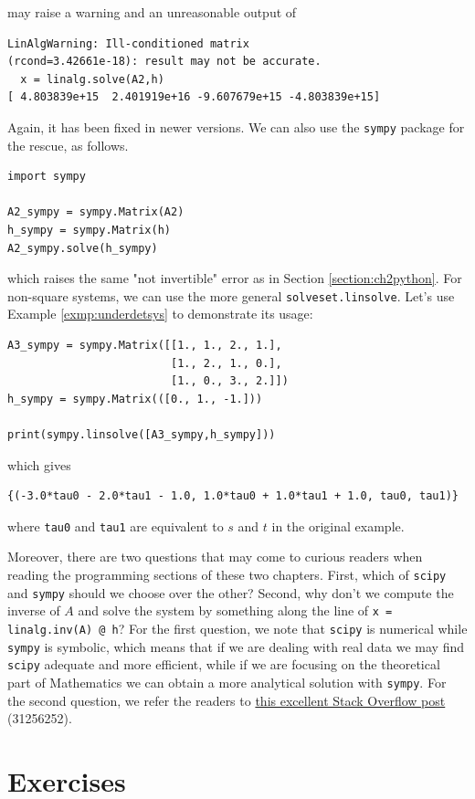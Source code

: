 may raise a warning and an unreasonable output of
\begin{lstlisting}
LinAlgWarning: Ill-conditioned matrix 
(rcond=3.42661e-18): result may not be accurate.
  x = linalg.solve(A2,h)
[ 4.803839e+15  2.401919e+16 -9.607679e+15 -4.803839e+15]   
\end{lstlisting}
Again, it has been fixed in newer versions. We can also use the \verb|sympy| package for the rescue, as follows.
\begin{lstlisting}
import sympy

A2_sympy = sympy.Matrix(A2)
h_sympy = sympy.Matrix(h)
A2_sympy.solve(h_sympy)
\end{lstlisting}
which raises the same "not invertible" error as in Section \ref{section:ch2python}. For non-square systems, we can use the more general \verb|solveset.linsolve|. Let's use Example \ref{exmp:underdetsys} to demonstrate its usage:
\begin{lstlisting}
A3_sympy = sympy.Matrix([[1., 1., 2., 1.],
                         [1., 2., 1., 0.],
                         [1., 0., 3., 2.]])
h_sympy = sympy.Matrix(([0., 1., -1.]))

print(sympy.linsolve([A3_sympy,h_sympy]))    
\end{lstlisting}
which gives
\begin{lstlisting}
{(-3.0*tau0 - 2.0*tau1 - 1.0, 1.0*tau0 + 1.0*tau1 + 1.0, tau0, tau1)}    
\end{lstlisting}
where \verb|tau0| and \verb|tau1| are equivalent to $s$ and $t$ in the original example.\par
Moreover, there are two questions that may come to curious readers when reading the programming sections of these two chapters. First, which of \verb|scipy| and \verb|sympy| should we choose over the other? Second, why don't we compute the inverse of $A$ and solve the system by something along the line of \verb|x = linalg.inv(A) @ h|? For the first question, we note that \verb|scipy| is numerical while \verb|sympy| is symbolic, which means that if we are dealing with real data we may find \verb|scipy| adequate and more efficient, while if we are focusing on the theoretical part of Mathematics we can obtain a more analytical solution with \verb|sympy|. For the second question, we refer the readers to \href{https://stackoverflow.com/questions/31256252/why-does-numpy-linalg-solve-offer-more-precise-matrix-inversions-than-numpy-li}{this excellent Stack Overflow post} (31256252).
\section{Exercises}

